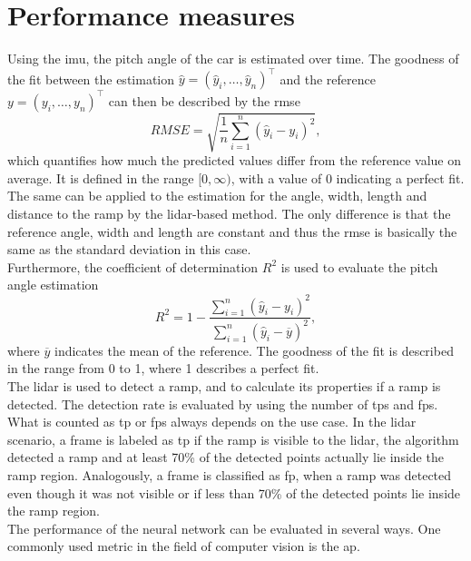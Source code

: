 \section{Performance measures}
\label{sec:performance_measures}
Using the \gls{imu}, the pitch angle of the car is estimated over time.
The goodness of the fit between the estimation $\hat{y} = (\hat{y}_i, \dots, \hat{y}_n)^\intercal$ and the reference $y = (y_i, \dots, y_n)^\intercal$ can then be described by the \gls{rmse}
\begin{equation}
	RMSE = \sqrt{\frac{1}{n}\sum_{i = 1}^n(\hat{y}_i - y_i)^2},
\end{equation}
which quantifies how much the predicted values differ from the reference value on average.
It is defined in the range $[0, \infty)$, with a value of 0 indicating a perfect fit.\\
The same can be applied to the estimation for the angle, width, length and distance to the ramp by the \gls{lidar}-based method.
The only difference is that the reference angle, width and length are constant and thus the \gls{rmse} is basically the same as the standard deviation in this case.\\
Furthermore, the coefficient of determination $R^2$ is used to evaluate the pitch angle estimation
\begin{equation}
	R^2 = 1 - \frac{\sum\limits_{i = 1}^n(\hat{y}_i - y_i)^2}{\sum\limits_{i = 1}^n(\hat{y}_i - \overline{y})^2},
\end{equation}
where $\overline{y}$ indicates the mean of the reference.
The goodness of the fit is described in the range from 0 to 1, where 1 describes a perfect fit.\\
The \gls{lidar} is used to detect a ramp, and to calculate its properties if a ramp is detected.
The detection rate is evaluated by using the number of \glspl{tp} and \glspl{fp}.
What is counted as \gls{tp} or \glspl{fp} always depends on the use case.
In the \gls{lidar} scenario, a frame is labeled as \gls{tp} if the ramp is visible to the \gls{lidar}, the algorithm detected a ramp and at least 70\% of the detected points actually lie inside the ramp region.
Analogously, a frame is classified as \gls{fp}, when a ramp was detected even though it was not visible or if less than 70\% of the detected points lie inside the ramp region.\\
The performance of the neural network can be evaluated in several ways.
One commonly used metric in the field of computer vision is the \gls{ap}.
